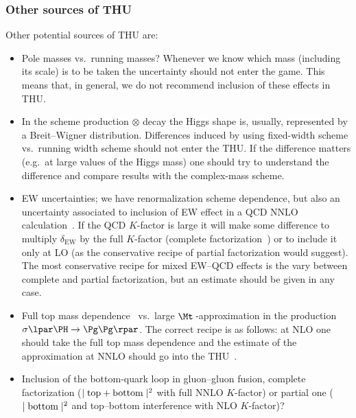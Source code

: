 \subsubsection{Other sources of THU}
Other potential sources of THU are:
\begin{itemize}
\item Pole masses vs.\ running masses? Whenever we know which mass (including its 
scale) is to be taken the uncertainty should not enter the game. This means that,
in general, we do not recommend inclusion of these effects in THU.

\item In the scheme production$\,\otimes\,$decay the Higgs shape is,
usually, represented by a Breit--Wigner distribution. Differences induced
by using fixed-width scheme vs.\ running width scheme should not enter the THU.
If the difference matters (e.g.\ at large values of the Higgs mass) one should
try to understand the difference and compare results with the complex-mass
scheme.

\item EW uncertainties; we have renormalization scheme dependence, but also an
uncertainty associated to inclusion of EW effect in a QCD NNLO 
calculation~\cite{Actis:2008ug}.
If the QCD $K$-factor is large it will make some difference to multiply
$\delta_{\mathrm{EW}}$ by the full $K$-factor (complete 
factorization~\cite{Anastasiou:2008tj}) or to include it 
only at LO (as the conservative recipe of partial factorization would suggest). 
The most conservative recipe for mixed EW--QCD effects is the vary between 
complete and partial factorization, but an estimate should be given in any case.

\item Full top mass dependence~\cite{Spira:1995rr} vs.\ large 
$\Mt\,$-approximation in the production $\sigma\lpar \PH \to \Pg\Pg\rpar$. 
The correct recipe is as follows: at NLO one should take the full top mass 
dependence and the estimate of the approximation at NNLO should go into the 
THU~\cite{Anastasiou:2009kn}.

\item Inclusion of the bottom-quark loop in gluon--gluon fusion, complete
factorization ($\mid \hbox{top} + \hbox{bottom}\mid^2$ with full NNLO $K$-factor) 
or partial one ($\mid \hbox{bottom}\mid^2$ and top--bottom interference with 
NLO $K$-factor)?


\end{itemize}
